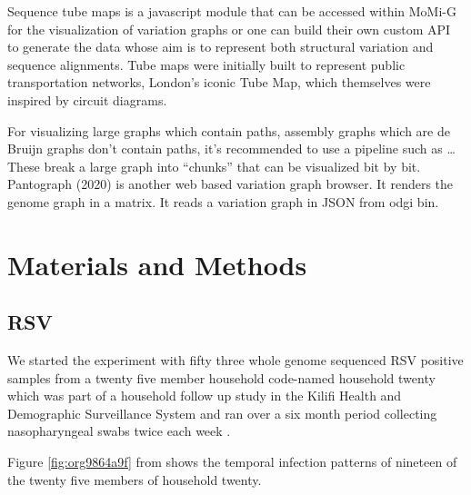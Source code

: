 \documentclass[10pt, a4paper]{article}
\begin{document}
Sequence tube maps \cite{beyerSequenceTubeMaps2019} is a javascript module that
can be accessed within MoMi-G for the visualization of variation graphs or one
can  build their own custom API to generate the data whose aim is to represent
both structural variation and sequence alignments.
Tube maps were initially built to represent public transportation networks,
London’s iconic Tube Map, \cite{cartwrightamBeckRepresentationLondon2012} which
themselves were inspired by circuit diagrams.

For visualizing large graphs which contain paths, assembly graphs which are de
Bruijn graphs don’t contain paths, it’s recommended to use a pipeline such as …
These break a large graph into “chunks” that can be visualized bit by bit.
Pantograph (2020) is another web based variation graph browser.
It renders the genome graph in a matrix. It reads a variation graph in JSON from
odgi bin.


\newpage
\section{Materials and Methods}
\label{sec:org2f5104c}
\subsection{RSV}
\label{sec:org3e204fe}
We started the experiment with fifty three whole genome sequenced RSV 
positive samples from a twenty five member household code-named household twenty
which was part of a household follow up study in the Kilifi Health and 
Demographic Surveillance System and ran over a six month
period collecting nasopharyngeal swabs twice each week
\cite{munywokiInfluenceAgeSeverity2015,agotiTransmissionPatternsEvolution2017,githinjiAssessingUtilityMinority2018}.

Figure \ref{fig:org9864a9f} from
\cite{githinjiAssessingUtilityMinority2018} shows the temporal infection patterns
of nineteen of the twenty five members of household twenty.
\end{document}
